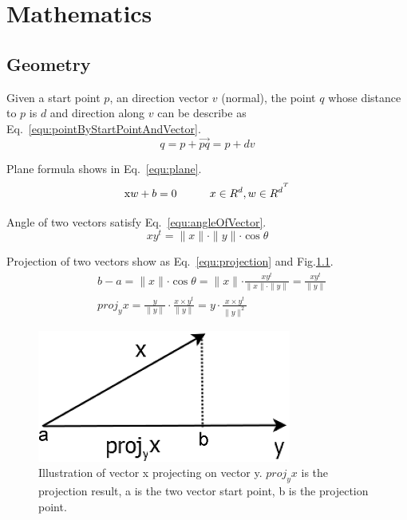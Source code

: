 \documentclass[runningheads,openany]{xhlPaper}
\begin{document}
\tableofcontents
\listoftables
\listoffigures

\chapter{Mathematics}
\section{Geometry}
Given a start point $p$, an direction vector $v$ (normal), the point $q$ whose distance to $p$ is $d$ and direction along $v$ can be describe as Eq.~\ref{equ:pointByStartPointAndVector}.
\begin{equation}
\label{equ:pointByStartPointAndVector}
q = p + \overrightarrow {pq} = p + dv
\end{equation}

Plane formula shows in Eq.~\ref{equ:plane}.
\begin{equation}
\label{equ:plane}
{\rm{x}}w + b = 0\quad\quad\quad{x \in {R^d},w \in {R^d}^{^T}}
\end{equation}

Angle of two vectors satisfy Eq.~\ref{equ:angleOfVector}.
\begin{equation}
\label{equ:angleOfVector}
x{y^t} = \parallel x\parallel  \cdot \parallel y\parallel  \cdot \cos \theta 
\end{equation}

Projection of two vectors show as Eq.~\ref{equ:projection} and Fig.\ref{fig:projection}.
\begin{equation}
\label{equ:projection}
\begin{aligned}
&b - a = \parallel x\parallel  \cdot \cos \theta  = \parallel x\parallel  \cdot \frac{{x{y^t}}}{{\parallel x\parallel  \cdot \parallel y\parallel }} = \frac{{x{y^t}}}{{\parallel y\parallel }}\\
&pro{j_y}x = \frac{y}{{\parallel y\parallel }} \cdot \frac{{x \times {y^t}}}{{\parallel y\parallel }} = y \cdot \frac{{x \times {y^t}}}{{\parallel y{\parallel ^2}}}
\end{aligned}
\end{equation}

\begin{figure}
\centering
\includegraphics[width=0.5\linewidth]{projection}
\caption{Illustration of vector x projecting on vector y. $proj_{y}x$ is the projection result, a is the two vector start point, b is the projection point.}
\label{fig:projection}
\end{figure}
\end{document}
